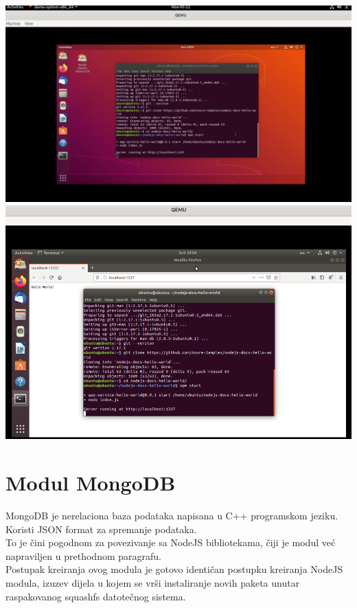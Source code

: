 \documentclass[12pt,vi]{mitthesis}
\begin{document}
\noindent
\includegraphics[width=\linewidth]{images/ModulNodeJSUbuntuTerminal.png}\\
\includegraphics[width=\linewidth]{images/ModulNodeJSUbuntu1.png} 
\newpage
\section*{Modul MongoDB}
MongoDB je nerelaciona baza podataka napisana u C++ programskom jeziku. Koristi JSON format za spremanje podataka.\\
To je čini pogodnom za povezivanje sa NodeJS bibliotekama, čiji je modul već napraviljen u prethodnom paragrafu.\\
Postupak kreiranja ovog modula je gotovo identičan postupku kreiranja NodeJS modula, izuzev dijela u kojem se vrši instaliranje novih paketa unutar raspakovanog squashfs datotečnog sistema.\\
\end{document}
